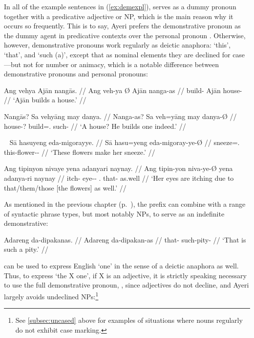 \xe


In all of the example sentences in (\ref{ex:demexpl}),
 serves as a dummy pronoun together with a
predicative adjective or NP, which is the main reason why it occurs so
frequently. This is to say, Ayeri prefers the demonstrative pronoun
 as the dummy agent in predicative contexts over the
personal pronoun . Otherwise, however, demonstrative
pronouns work regularly as deictic anaphora: `this', `that', and `such (a)',
except that as nominal elements they are declined for case---but not for number
or animacy, which is a notable difference between demonstrative pronouns and
personal pronouns:

\pex
\a\begingl
	\gla Ang vehya {} Ajān nangās. //
	\glb Ang veh-ya Ø Ajān nanga-as //
	\glc \AgtT{} build-\TsgM{} \Top{} Ajān house-\Parg{} //
	\glft `Ajān builds a house.' //
\endgl

\a\begingl
	\gla Nangās? Sa vehyāng may danya. //
	\glb Nanga-as? Sa veh=yāng may danya-Ø //
	\glc house-\Parg{}? \PatT{} build=\TsgM{}.\Aarg{} \Aff{} such-\Top{} //
	\glft `A house? He builds one indeed.' //
\endgl

\xe

\pex~
\a\begingl
	\gla Sā hasuyeng eda-migorayye. //
	\glb Sā hasu=yeng eda-migoray-ye-Ø //
	\glc \CauT{} sneeze=\TsgF{}.\Aarg{} this-flower-\Pl{}-\Top{} //
	\glft `These flowers make her sneeze.' //
\endgl

\a\begingl
	\gla Ang tipinyon nivaye yena adanyari naynay. //
	\glb Ang tipin-yon niva-ye-Ø yena adanya-ri naynay //
	\glc \AgtT{} itch-\TplN{} eye-\Pl{}-\Top{} \TsgF{}.\Gen{} that-\Caus{} 
		as.well //
	\glft `Her eyes are itching due to that/them/those [the flowers] as 
		well.' //
\endgl
\xe

As mentioned in the previous chapter (p.~\pageref{nounprefixes}), the prefix 
 can combine with a range of syntactic phrase types, 
but most notably NPs, to serve as an indefinite demonstrative:

\ex\begingl
	\gla Adareng da-dipakanas. //
	\glb Adareng da-dipakan-as //
	\glc that-\AargI{} such-pity-\Parg{} //
	\glft `That is such a pity.' //
\endgl\xe

 can be used to express English `one' in the sense of a deictic 
anaphora as well. Thus, to express `the X one', if X is an adjective, it is 
strictly speaking necessary to use the full demonstrative pronoun, 
, since adjectives do not decline, and Ayeri largely avoids 
undeclined NPs:\footnote{See \autoref{subsec:uncased} above for examples of 
situations where nouns regularly do not exhibit case marking.}

